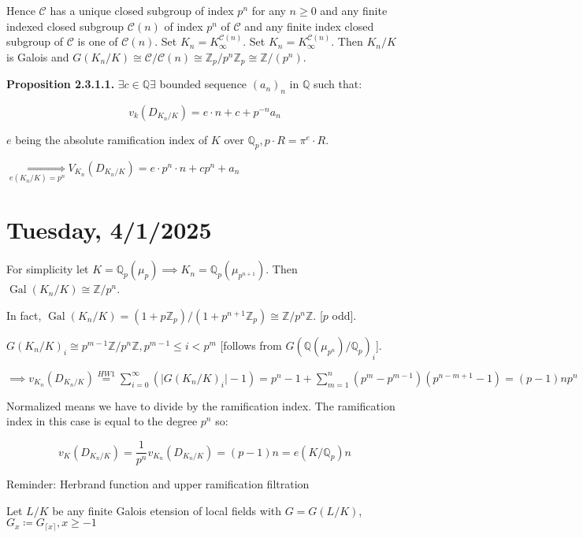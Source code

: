 \documentclass{article}
\theoremstyle{definition}
\numberwithin{theorem}{subsection}
\begin{document}
    Hence \(\mathscr{C}\) has a unique closed subgroup of index \(p^n\) for any \(n \geq 0\) and any finite indexed closed subgroup \(\mathscr{C}(n)\) of index \(p^n\) of \(\mathscr{C}\) and any finite index closed subgroup of \(\mathscr{C}\) is one of \(\mathscr{C}(n)\). Set \(K_n = K_\infty^{\mathscr{C}(n)}\). Set \(K_n = K_\infty ^{\mathscr{C} (n)}\). Then \(K_n / K\) is Galois and \(G(K_n / K) \cong \mathscr{C} / \mathscr{C}(n) \cong \mathbb{Z}_p / p^n \mathbb{Z}_p \cong \mathbb{Z} / (p^n)\).

    \textbf{Proposition 2.3.1.1.} \(\exists c\in \mathbb{Q} \exists\) bounded sequence \((a_n)_n\) in \(\mathbb{Q}\) such that:

    \[
        v_k(D_{K_n / K}) = e \cdot n + c + p^{-n} a_n
    \]

    \(e\) being the absolute ramification index of \(K\) over \(\mathbb{Q}_p, p \cdot R= \pi^e \cdot R\). 

    \(\underset{e(K_n / K) = p^n}{\iff} V_{K_n}(D_{K_n / K}) = e \cdot p^n \cdot n + c p^n + a_n\) 

    \section*{Tuesday, 4/1/2025}
    
    For simplicity let \(K = \mathbb{Q}_p(\mu_p) \implies K_n = \mathbb{Q}_p(\mu_{p^{n+1}})\). Then \(\operatorname{Gal}(K_n / K)  \cong \mathbb{Z} / p^n\).

    In fact, \(\operatorname{Gal}(K_n / K) = (1 + p \mathbb{Z}_p) / (1+p^{n+1} \mathbb{Z}_p) \cong \mathbb{Z} / p^n \mathbb{Z}\). [\(p\) odd].
    
    \(G(K_n / K)_i \cong p^{m-1}\mathbb{Z} / p^n \mathbb{Z}, p^{m-1} \leq i < p^m\) [follows from \(G(\mathbb{Q}(\mu_{p^n}) / \mathbb{Q}_p)_i\)].

    \(\implies v_{K_n}(D_{K_n / K}) \overset{HW1}{=} \sum_{i=0}^{\infty} (\vert G(K_n / K)_i \vert - 1) = p^n - 1 + \sum_{m=1}^n (p^m - p^{m-1})(p^{n-m+1} - 1) = (p-1)n p^n\)
    
    Normalized means we have to divide by the ramification index. The ramification index in this case is equal to the degree \(p^n\) so:

    \[
        v_K(D_{K_n / K}) = \frac{1}{p^n} v_{K_n}(D_{K_n / K}) = (p-1)n = e(K / \mathbb{Q}_p) n
    \]

    Reminder: Herbrand function and upper ramification filtration

    Let \(L / K\) be any finite Galois etension of local fields with \(G = G(L / K)\), \(G_{x} \coloneqq G_{\lceil x \rceil}, x \geq -1\)
    
\end{document}
